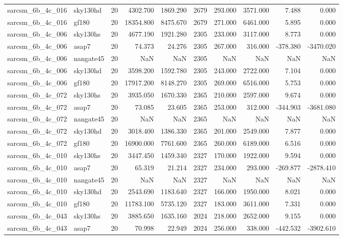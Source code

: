 \begin{longtable}{llrrrrrrrr}
sarcsm\_6b\_4c\_016 & sky130hd & 20 & 4302.700 & 1869.290 & 2679 & 293.000 & 3571.000 & 7.488 & 0.000 \\
sarcsm\_6b\_4c\_016 & gf180 & 20 & 18354.800 & 8475.670 & 2679 & 271.000 & 6461.000 & 5.895 & 0.000 \\
sarcsm\_6b\_4c\_006 & sky130hs & 20 & 4677.190 & 1921.280 & 2305 & 233.000 & 3117.000 & 8.773 & 0.000 \\
sarcsm\_6b\_4c\_006 & asap7 & 20 & 74.373 & 24.276 & 2305 & 267.000 & 316.000 & -378.380 & -3470.020 \\
sarcsm\_6b\_4c\_006 & nangate45 & 20 & NaN & NaN & 2305 & NaN & NaN & NaN & NaN \\
sarcsm\_6b\_4c\_006 & sky130hd & 20 & 3598.200 & 1592.780 & 2305 & 243.000 & 2722.000 & 7.104 & 0.000 \\
sarcsm\_6b\_4c\_006 & gf180 & 20 & 17917.200 & 8148.270 & 2305 & 269.000 & 6516.000 & 5.753 & 0.000 \\
sarcsm\_6b\_4c\_072 & sky130hs & 20 & 3935.050 & 1670.330 & 2365 & 210.000 & 2597.000 & 9.674 & 0.000 \\
sarcsm\_6b\_4c\_072 & asap7 & 20 & 73.085 & 23.605 & 2365 & 253.000 & 312.000 & -344.903 & -3681.080 \\
sarcsm\_6b\_4c\_072 & nangate45 & 20 & NaN & NaN & 2365 & NaN & NaN & NaN & NaN \\
sarcsm\_6b\_4c\_072 & sky130hd & 20 & 3018.400 & 1386.330 & 2365 & 201.000 & 2549.000 & 7.877 & 0.000 \\
sarcsm\_6b\_4c\_072 & gf180 & 20 & 16900.000 & 7761.600 & 2365 & 260.000 & 6189.000 & 6.516 & 0.000 \\
sarcsm\_6b\_4c\_010 & sky130hs & 20 & 3447.450 & 1459.340 & 2327 & 170.000 & 1922.000 & 9.594 & 0.000 \\
sarcsm\_6b\_4c\_010 & asap7 & 20 & 65.319 & 21.214 & 2327 & 234.000 & 293.000 & -269.877 & -2878.410 \\
sarcsm\_6b\_4c\_010 & nangate45 & 20 & NaN & NaN & 2327 & NaN & NaN & NaN & NaN \\
sarcsm\_6b\_4c\_010 & sky130hd & 20 & 2543.690 & 1183.640 & 2327 & 166.000 & 1950.000 & 8.021 & 0.000 \\
sarcsm\_6b\_4c\_010 & gf180 & 20 & 11783.100 & 5735.120 & 2327 & 183.000 & 3611.000 & 7.331 & 0.000 \\
sarcsm\_6b\_4c\_043 & sky130hs & 20 & 3885.650 & 1635.160 & 2024 & 218.000 & 2652.000 & 9.155 & 0.000 \\
sarcsm\_6b\_4c\_043 & asap7 & 20 & 70.998 & 22.949 & 2024 & 256.000 & 338.000 & -442.532 & -3902.610 \\

\end{longtable}
